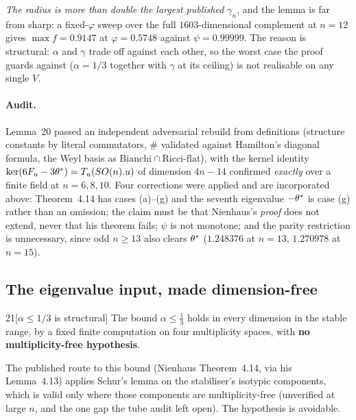 \emph{The radius is more than double the largest published $\gamma_n$}, and the lemma is far from sharp: a fixed-$\varphi$ sweep over the full $1603$-dimensional complement at $n=12$ gives $\max f=0.9147$ at $\varphi=0.5748$ against $\psi=0.99999$. The reason is structural: $\alpha$ and $\gamma$ trade off against each other, so the worst case the proof guards against ($\alpha=1/3$ together with $\gamma$ at its ceiling) is not realisable on any single $V$.

\paragraph{Audit.} Lemma~20 passed an independent adversarial rebuild from definitions (structure constants by literal commutators, $\#$ validated against Hamilton's diagonal formula, the Weyl basis as $\mathrm{Bianchi}\cap\mathrm{Ricci\text{-}flat}$), with the kernel identity $\ker(6F_u-3\theta^{*})=T_u(SO(n).u)$ of dimension $4n-14$ confirmed \emph{exactly} over a finite field at $n=6,8,10$. Four corrections were applied and are incorporated above: Theorem~4.14 has cases (a)--(g) and the seventh eigenvalue $-\theta^{*}$ is case (g) rather than an omission; the claim must be that Nienhaus's \emph{proof} does not extend, never that his theorem fails; $\psi$ is not monotone; and the parity restriction is unnecessary, since odd $n\ge13$ also clears $\theta^{*}$ ($1.248376$ at $n=13$, $1.270978$ at $n=15$).

\subsection{The eigenvalue input, made dimension-free}

\begin{Lem}{21}[$\alpha\le1/3$ is structural]
The bound $\alpha\le\tfrac13$ holds in every dimension in the stable range, by a fixed finite computation on four multiplicity spaces, with \textbf{no multiplicity-free hypothesis}.
\end{Lem}

The published route to this bound (Nienhaus Theorem~4.14, via his Lemma~4.13) applies Schur's lemma on the stabiliser's isotypic components, which is valid only where those components are multiplicity-free (unverified at large $n$, and the one gap the tube audit left open). The hypothesis is avoidable.

